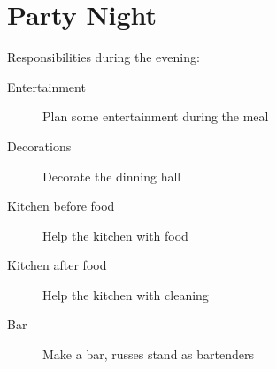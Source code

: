 \documentclass[../../../main.tex]{subfiles}
\begin{document}
\section{Party Night}
Responsibilities during the evening:
\begin{description}
\item[Entertainment] Plan some entertainment during the meal
\item[Decorations] Decorate the dinning hall
\item[Kitchen before food] Help the kitchen with food
\item[Kitchen after food] Help the kitchen with cleaning
\item[Bar] Make a bar, russes stand as bartenders
\end{description}
\end{document}
